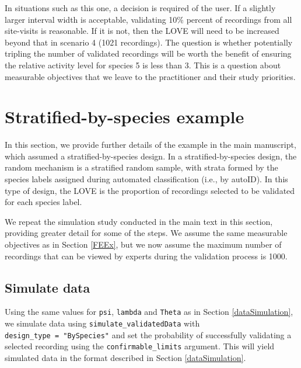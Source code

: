 \documentclass[
]{article}
\begin{document}
In situations such as this one, a decision is required of the user. If a slightly larger interval width is acceptable, validating 10\% percent of recordings from all site-visits is reasonable. If it is not, then the LOVE will need to be increased beyond that in scenario 4 (1021 recordings). The question is whether potentially tripling the number of validated recordings will be worth the benefit of ensuring the relative activity level for species 5 is less than 3. This is a question about measurable objectives that we leave to the practitioner and their study priorities.

\newpage

\section{\texorpdfstring{Stratified-by-species example \label{stratEx}}{Stratified-by-species example }}\label{stratified-by-species-example}

In this section, we provide further details of the example in the main manuscript, which assumed a stratified-by-species design. In a stratified-by-species design, the random mechanism is a stratified random sample, with strata formed by the species labels assigned during automated classification (i.e., by autoID). In this type of design, the LOVE is the proportion of recordings selected to be validated for each species label.

We repeat the simulation study conducted in the main text in this section, providing greater detail for some of the steps. We assume the same measurable objectives as in Section \ref{FEEx}, but we now assume the maximum number of recordings that can be viewed by experts during the validation process is 1000.

\subsection{\texorpdfstring{Simulate data \label{simBySpp}}{Simulate data }}\label{simulate-data}

Using the same values for \texttt{psi}, \texttt{lambda} and \texttt{Theta} as in Section \ref{dataSimulation}, we simulate data using \texttt{simulate\_validatedData} with \texttt{design\_type\ =\ "BySpecies"} and set the probability of successfully validating a selected recording using the \texttt{confirmable\_limits} argument. This will yield simulated data in the format described in Section \ref{dataSimulation}.

\linespread{1}
\end{document}
